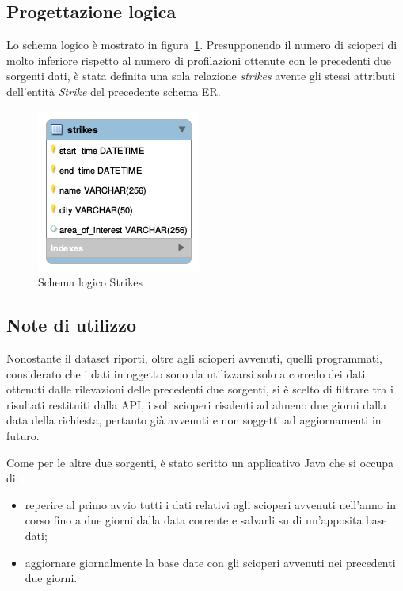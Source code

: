 \subsection{Progettazione logica}

Lo schema logico è mostrato in figura~\ref{fig:strikes_logic}.
Presupponendo il numero di scioperi di molto inferiore rispetto al numero di profilazioni
ottenute con le precedenti due sorgenti dati, è stata definita una sola relazione
\textit{strikes} avente gli stessi attributi dell'entità \textit{Strike} del precedente 
schema ER.

\begin{figure}                                                                                                                                                            
\centering                                                                                                                                                                   
\includegraphics{diagrams/strikes_logic}                                                                                                                                   
\caption{Schema logico Strikes}                                                                                                                                            
\label{fig:strikes_logic}                                                                                                                                                           
\end{figure}

\subsection{Note di utilizzo}

Nonostante il dataset riporti, oltre agli scioperi avvenuti, quelli programmati,
considerato che i dati in oggetto sono da utilizzarsi solo a corredo dei dati
ottenuti dalle rilevazioni delle precedenti due sorgenti, si è scelto di filtrare
tra i risultati restituiti dalla API, i soli scioperi risalenti ad almeno due
giorni dalla data della richiesta, pertanto già avvenuti e non soggetti ad
aggiornamenti in futuro.

Come per le altre due sorgenti, è stato scritto un applicativo Java che si occupa
di:
\begin{itemize}
\item reperire al primo avvio tutti i dati relativi agli scioperi avvenuti
nell'anno in corso fino a due giorni dalla data corrente e salvarli su di
un'apposita base dati;
\item aggiornare giornalmente la base date con gli scioperi avvenuti nei
precedenti due giorni.
\end{itemize}

